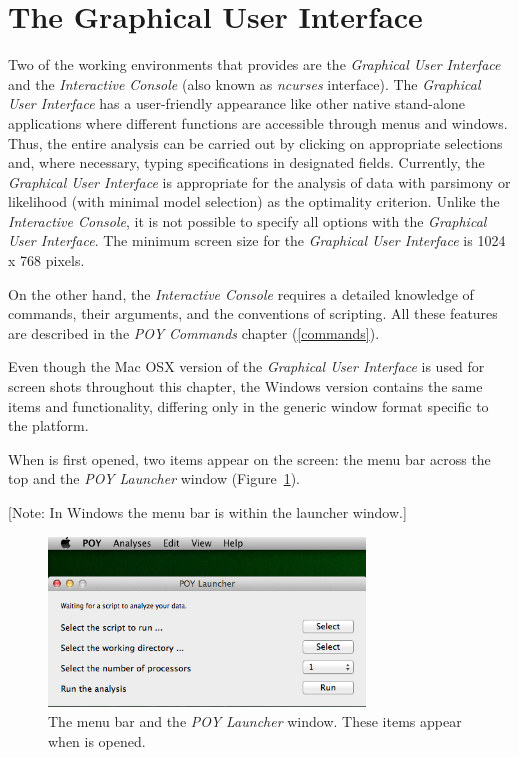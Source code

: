 
\section{The Graphical User Interface}

Two of the working environments that \poy provides are the \emph{Graphical User Interface} and the 
\emph{Interactive Console} (also known as  \emph{ncurses} interface). The \emph{Graphical User 
Interface} has a user-friendly appearance like other native stand-alone applications where different 
functions are accessible through menus and windows. Thus, the entire analysis can be 
carried out by clicking on appropriate selections and, where necessary, typing specifications in 
designated fields. Currently, the \emph{Graphical User Interface} is appropriate for the analysis of 
data with parsimony or likelihood (with minimal model selection) as the optimality criterion.  Unlike the 
\emph{Interactive Console}, it is not possible to specify all options with the \emph{Graphical User Interface}.
The minimum screen size for the \emph{Graphical User Interface} is 1024 x 768 pixels.

On the other hand, the \emph{Interactive Console} requires a detailed knowledge of \poy commands, 
their arguments, and the conventions of \poy scripting. All these features are described in the 
\emph{POY Commands} chapter (\ref{commands}).

Even though the Mac OSX version of the \emph{Graphical User Interface} is used for screen 
shots throughout this chapter, the Windows version contains the same items and 
functionality, differing only in the generic window format specific to the platform.

When \poy is first opened, two items appear on the screen: the \poy menu bar across the top and the 
\emph{POY Launcher} window (Figure~\ref{fig:menu_launcher_window}). 

[Note: In Windows the menu bar is within the launcher window.]

\begin{figure}[htpb]
    \begin{center}
        \includegraphics[width=0.75\textwidth]{doc/figures/menu_launcher_window.jpg}
    \end{center}
    \caption{The \poy menu bar and the \emph{POY Launcher} window. These items appear when \poy is opened.}
    \label{fig:menu_launcher_window}
\end{figure}


